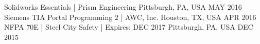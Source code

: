 
\begin{cvhonors}
	\cvhonor
	{Solidworks Essentials |} %
	{Prism Engineering} %
	{Pittsburgh, PA, USA} %
	{MAY 2016} %
	\cvhonor
	{Siemens TIA Portal Programming 2 |} %
	{AWC, Inc.} %
	{Houston, TX, USA} %
	{APR 2016} %
	\cvhonor
	{NFPA 70E |} %
	{Steel City Safety | Expires: DEC 2017} %
	{Pittsburgh, PA, USA} %
	{DEC 2015} %
\end{cvhonors}